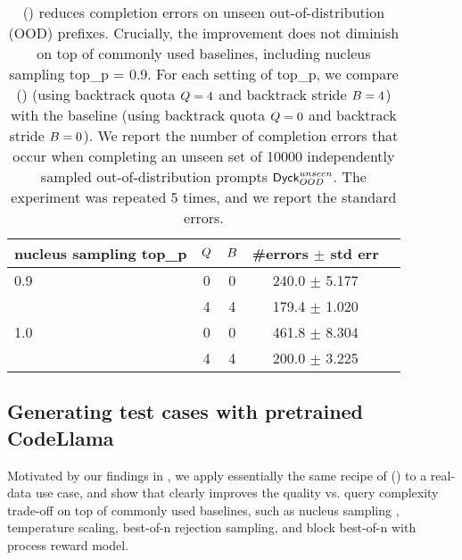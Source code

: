 \begin{table}[h]
\begin{center}
\begin{small}
\begin{tabular}{ lcccc }
\toprule
\textbf{nucleus sampling top\_p} & \textbf{$Q$} & \textbf{$B$} & \textbf{\#errors $\pm$ std err} \\
\hline
0.9 & 0 & 0 & 240.0 $\pm$ 5.177 \\
\hline
  & 4 & 4 & 179.4 $\pm$ 1.020 \\
\hline
1.0 & 0 & 0 & 461.8 $\pm$ 8.304 \\
\hline
  & 4 & 4 & 200.0 $\pm$ 3.225 \\
\bottomrule
\end{tabular}
\end{small}
\end{center}
\caption{
\algoName () reduces completion errors on unseen out-of-distribution (OOD) prefixes.
Crucially, the improvement does not diminish on top of commonly used baselines, including
nucleus sampling top\_p = 0.9.
For each setting of top\_p,
we compare \algoName ()
(using backtrack quota $Q = 4$
and backtrack stride $B = 4$)
with the baseline 
(using backtrack quota $Q = 0$
and backtrack stride $B = 0$).
We report the number of completion errors that occur when completing an unseen set of 10000 independently sampled out-of-distribution prompts $\mathsf{Dyck}_{OOD}^{unseen}$.
The experiment was repeated 5 times,
and we report the standard errors.
}
\label{table:verifier_reduces_errors_unseen_ood}
\end{table}





\subsection{Generating test cases with pretrained CodeLlama}
\label{sec:experiments:codellama}

Motivated by our findings in ,
we apply essentially the same recipe of 
\algoName ()
to a real-data use case,
and show that  clearly improves the quality vs. query complexity trade-off on top of commonly used baselines, such as 
nucleus sampling \citep{holtzman2020the},
temperature scaling,
best-of-n rejection sampling,
and block best-of-n with process reward model.

